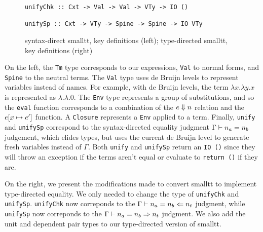 \begin{figure*}
\begin{minipage}[t]{.54\textwidth}
\begin{leftbar}
\begin{lstlisting}
unifyChk :: Cxt -> Val -> Val -> VTy -> IO ()

unifySp :: Cxt -> VTy -> Spine -> Spine -> IO VTy
\end{lstlisting}
\end{leftbar}
\end{minipage}
\caption{syntax-direct smalltt, key definitions (left); type-directed smalltt, key definitions (right)}
\label{fig:smalltt}
\end{figure*}

On the left, the \lstinline{Tm} type corresponds to our expressions, \lstinline{Val} to normal forms, and \lstinline{Spine} to the neutral terms.
The \lstinline{Val} type uses de Bruijn levels to represent variables instead of names.
For example, with de Bruijn levels, the term $\lambda x. \lambda y. x$ is represented as $\lambda. \lambda. 0$.
The \lstinline{Env} type represents a group of substitutions, and so the \lstinline{eval} function corresponds to a combination of the $e \Downarrow n$ relation and the $e [x \mapsto e']$ function.
A \lstinline{Closure} represents a \lstinline{Env} applied to a term.
Finally, \lstinline{unify} and \lstinline{unifySp} correspond to the syntax-directed equality judgment $\Gamma \vdash n_a = n_b$ judgement, which elides types, but uses the current de Bruijn level to generate fresh variables instead of $\Gamma$.
Both \lstinline{unify} and \lstinline{unifySp} return an \lstinline{IO ()} since they will throw an exception if the terms aren't equal or evaluate to \lstinline{return ()} if they are.

On the right, we present the modifications made to convert smalltt to implement type-directed equality.
We only needed to change the type of \lstinline{unifyChk} and \lstinline{unifySp}.
\lstinline{unifyChk} now correponds to the $\Gamma \vdash n_a = n_b \Leftarrow n_t$ judgment, while \lstinline{unifySp} now correponds to the $\Gamma \vdash n_a = n_b \Rightarrow n_t$ judgment.
We also add the unit and dependent pair types to our type-directed version of smalltt.


